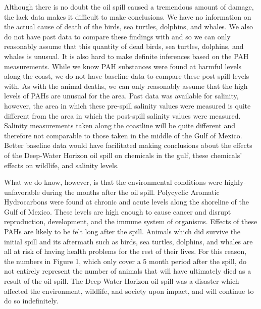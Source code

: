 \documentclass[authoryear,12pt]{elsarticle}
\begin{document}
Although there is no doubt the oil spill caused a tremendous amount of damage, the lack data makes it difficult to make conclusions. We have no information on the actual cause of death of the birds, sea turtles, dolphins, and whales.  We also do not have past data to compare these findings with and so we can only reasonably assume that this quantity of dead birds, sea turtles, dolphins, and whales is unusual. It is also hard to make definite inferences based on the PAH measurements.  While we know PAH substances were found at harmful levels along the coast, we do not have baseline data to compare these post-spill levels with. As with the animal deaths, we can only reasonably assume that the high levels of PAHs are unusual for the area. Past data was available for salinity, however, the area in which these pre-spill salinity values were measured is quite different from the area in which the post-spill salinity values were measured.  Salinity measurements taken along the coastline will be quite different and therefore not comparable to those taken in the middle of the Gulf of Mexico. Better baseline data would have facilitated making conclusions about the effects of the Deep-Water Horizon oil spill on chemicals in the gulf, these chemicals' effects on wildlife, and salinity levels.

 What we do know, however, is that the environmental conditions were highly-unfavorable during the months after the oil spill. Polycyclic Aromatic Hydrocarbons were found at chronic and acute levels along the shoreline of the Gulf of Mexico. These levels are high enough to cause cancer and disrupt reproduction, development, and the immune system of organisms. Effects of these PAHs are likely to be felt long after the spill. Animals which did survive the initial spill and its aftermath such as birds, sea turtles, dolphins, and whales are all at risk of having health problems for the rest of their lives. For this reason, the numbers in Figure 1, which only cover a 5 month period after the spill, do not entirely represent the number of animals that will have ultimately died as a result of the oil spill. The Deep-Water Horizon oil spill was a disaster which affected the environment, wildlife, and society upon impact, and will continue to do so indefinitely.



\end{document}
